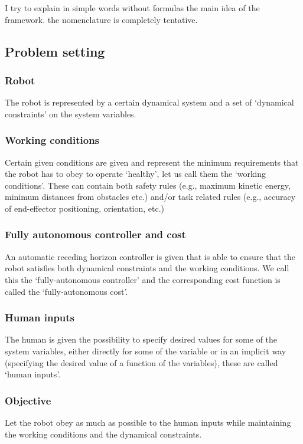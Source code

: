 I try to explain in simple words without formulas the main idea of the framework. the nomenclature is completely tentative.

\subsection{Problem setting}

\subsubsection{Robot} The robot is represented by a certain dynamical system and a set of `dynamical constraints' on the system variables.


\subsubsection{Working conditions}
Certain given conditions are given and represent the minimum requirements that the robot has to obey to operate `healthy', let us call them the `working conditions'. These can contain both safety rules (e.g., maximum kinetic energy, minimum distances from obstacles etc.) and/or task related rules (e.g., accuracy of end-effector positioning, orientation, etc.)

\subsubsection{Fully autonomous controller and cost} 
An automatic receding horizon controller is given that is able to ensure that the robot satisfies both dynamical constraints and the working conditions. We call this the `fully-autonomous controller' and the corresponding cost function is called the `fully-autonomous cost'.

\subsubsection{Human inputs}
The human is given the possibility to specify desired values for some of the system variables, either directly for some of the variable or in an implicit way (specifying the desired value of a function of the variables), these are called `human inputs'.

\subsubsection{Objective} 
Let the robot obey as much as possible to the human inputs while maintaining the working conditions and the dynamical constraints.


